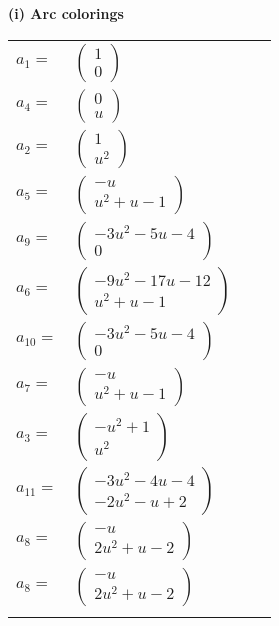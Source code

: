 \documentclass[1p]{elsarticle_modified}
\theoremstyle{definition}
\begin{document}
\flushleft \textbf{(i) Arc colorings}\\
\begin{tabular}{m{7pt} m{180pt} m{7pt} m{180pt} }
\flushright $a_{1}=$&$\begin{pmatrix}1\\0\end{pmatrix}$ \\
\flushright $a_{4}=$&$\begin{pmatrix}0\\u\end{pmatrix}$ \\
\flushright $a_{2}=$&$\begin{pmatrix}1\\u^2\end{pmatrix}$ \\
\flushright $a_{5}=$&$\begin{pmatrix}- u\\u^2+u-1\end{pmatrix}$ \\
\flushright $a_{9}=$&$\begin{pmatrix}-3 u^2-5 u-4\\0\end{pmatrix}$ \\
\flushright $a_{6}=$&$\begin{pmatrix}-9 u^2-17 u-12\\u^2+u-1\end{pmatrix}$ \\
\flushright $a_{10}=$&$\begin{pmatrix}-3 u^2-5 u-4\\0\end{pmatrix}$ \\
\flushright $a_{7}=$&$\begin{pmatrix}- u\\u^2+u-1\end{pmatrix}$ \\
\flushright $a_{3}=$&$\begin{pmatrix}- u^2+1\\u^2\end{pmatrix}$ \\
\flushright $a_{11}=$&$\begin{pmatrix}-3 u^2-4 u-4\\-2 u^2- u+2\end{pmatrix}$ \\
\flushright $a_{8}=$&$\begin{pmatrix}- u\\2 u^2+u-2\end{pmatrix}$\\ \flushright $a_{8}=$&$\begin{pmatrix}- u\\2 u^2+u-2\end{pmatrix}$\\&\end{tabular}
\end{document}
